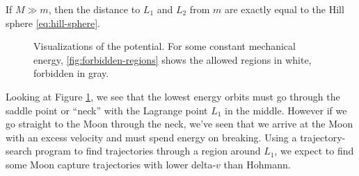 If $M \gg m$, then the distance to $L_1$ and $L_2$ from $m$ are exactly equal to the Hill sphere \eqref{eq:hill-sphere}.

\begin{figure}[ht]
    \centering
        \caption{Visualizations of the potential. For some constant mechanical energy, \ref{fig:forbidden-regions} shows the allowed regions in white, forbidden in gray.}
    \label{fig:potential-visualizations}
\end{figure}
Looking at Figure \ref{fig:potential-visualizations}, we see that the lowest energy orbits must go through the saddle point or ``neck'' with the Lagrange point $L_1$ in the middle. However if we go straight to the Moon through the neck, we've seen that we arrive at the Moon with an excess velocity and must spend energy on breaking. Using a trajectory-search program to find trajectories through a region around $L_1$, we expect to find some Moon capture trajectories with lower delta-$v$ than Hohmann.
